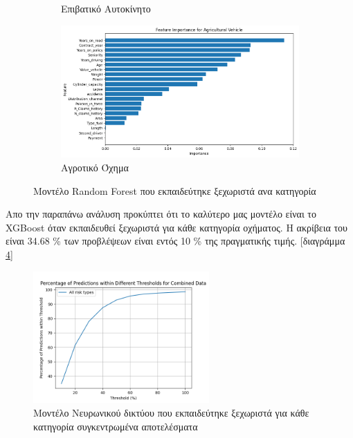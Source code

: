 \documentclass{llncs}
\begin{document}
\begin{figure}
\begin{subfigure}{0.45\linewidth}
       \caption{Επιβατικό Αυτοκίνητο}
       \label{fig:subrandom3}
        \end{subfigure}
         \begin{subfigure}{0.45\linewidth}
        \includegraphics[width=\linewidth]{images/Agricultural Vehicle_feature_importance_random_forest.png}
        \caption{Αγροτικό Όχημα}
        \label{fig:subrandom4}
         \end{subfigure}
  \caption{Μοντέλο Random Forest που εκπαιδεύτηκε ξεχωριστά ανα κατηγορία}
  \label{fig:RandomForest_split_importance}
\end{figure}

Απο την παραπάνω ανάλυση προκύπτει ότι το καλύτερο μας μοντέλο είναι το XGBoost 
όταν εκπαιδευθεί ξεχωριστά για κάθε κατηγορία οχήματος. Η ακρίβεια του είναι 
34.68 \% των προβλέψεων είναι εντός 10 \% της πραγματικής τιμής. 
[διαγράμμα \ref{fig:XGBoost_best_result_combined}]

\begin{figure}
    \begin{center}
        \includegraphics[width=0.6\textwidth]{images/combined_thresholds_xgb.png}
    \end{center}
    \caption{Μοντέλο Νευρωνικού δικτύου που εκπαιδεύτηκε ξεχωριστά για κάθε κατηγορία συγκεντρωμένα αποτελέσματα}  
    \label{fig:XGBoost_best_result_combined}  
\end{figure}
\end{document}
